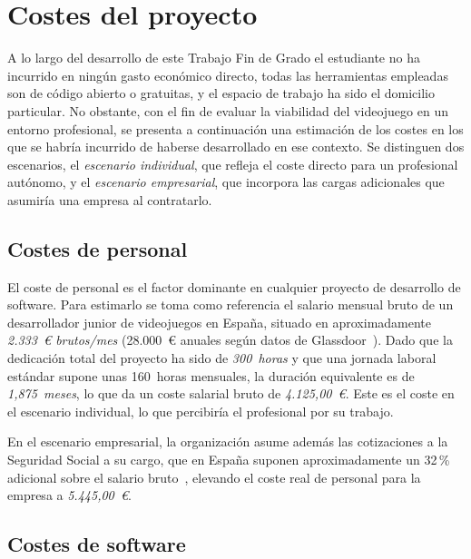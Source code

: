 \section{Costes del proyecto}

A lo largo del desarrollo de este Trabajo Fin de Grado el estudiante no ha incurrido en ningún gasto económico directo, todas las herramientas empleadas son de código abierto o gratuitas, y el espacio de trabajo ha sido el domicilio particular. No obstante, con el fin de evaluar la viabilidad del videojuego en un entorno profesional, se presenta a continuación una estimación de los costes en los que se habría incurrido de haberse desarrollado en ese contexto. Se distinguen dos escenarios, el \textit{escenario individual}, que refleja el coste directo para un profesional autónomo, y el \textit{escenario empresarial}, que incorpora las cargas adicionales que asumiría una empresa al contratarlo.

\subsection{Costes de personal}

El coste de personal es el factor dominante en cualquier proyecto de desarrollo de software. Para estimarlo se toma como referencia el salario mensual bruto de un desarrollador junior de videojuegos en España, situado en aproximadamente \textit{2.333~€ brutos/mes} (28.000~€ anuales según datos de Glassdoor~\cite{glassdoor_gamedeveloper}). Dado que la dedicación total del proyecto ha sido de \textit{300~horas} y que una jornada laboral estándar supone unas 160~horas mensuales, la duración equivalente es de \textit{1,875~meses}, lo que da un coste salarial bruto de \textit{4.125,00~€}. Este es el coste en el escenario individual, lo que percibiría el profesional por su trabajo.

En el escenario empresarial, la organización asume además las cotizaciones a la Seguridad Social a su cargo, que en España suponen aproximadamente un 32\,\% adicional sobre el salario bruto~\cite{seguridad_social_costes}, elevando el coste real de personal para la empresa a \textit{5.445,00~€}.

\subsection{Costes de software}

